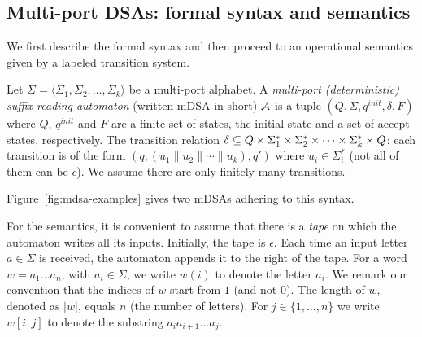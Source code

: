 
\subsection{Multi-port DSAs: formal syntax and semantics} 

We first describe the formal syntax and then proceed to an operational semantics given by a labeled transition system.

\begin{definition} Let
  $\Sigma = \langle \Sigma_1, \Sigma_2, \dots, \Sigma_k \rangle$ be a
  multi-port alphabet. A \emph{multi-port (deterministic)
    suffix-reading automaton} (written mDSA in short) $\mathcal{A}$ is a
  tuple $(Q, \Sigma, q^{init}, \delta, F)$ where $Q$, $q^{init}$ and
  $F$ are a finite set of states, the initial state and a set of
  accept states, respectively. %
  The transition relation
  $\delta \subseteq Q \times \Sigma_1^* \times \Sigma_2^* \times \cdots
  \times \Sigma_k^* \times Q$: each transition is of the form
  $(q, (u_1 \parallel u_2 \parallel \cdots \parallel u_k), q')$ where
  $u_i \in \Sigma_i^*$ (not all of them can be $\epsilon$). %
  We assume there are only finitely many transitions. %
 \end{definition}%
Figure~\ref{fig:mdsa-examples} gives two mDSAs adhering to this syntax. %

 For the semantics, it is convenient to assume that there is a \emph{tape} on which the automaton writes all its inputs. Initially, the tape is $\epsilon$. Each time an input letter $a \in \Sigma$ is received, the automaton appends it to the right of the tape. 
 For a word $w = a_1 \dots a_{n}$, with $a_i \in \Sigma$, we write $w(i)$ to denote the letter $a_i$. We remark our convention that the indices of $w$ start from $1$ (and not $0$). The length of $w$, denoted as $|w|$, equals $n$ (the number of letters). For $j \in \{1, \dots, n\}$ we write $w[i, j]$ to denote the substring $a_i a_{i+1} \dots a_j$.

